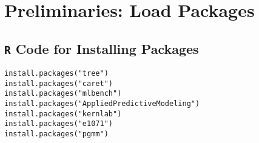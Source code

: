 \documentclass[caret-main.tex]{subfiles}
\begin{document}
\section{Preliminaries: Load  Packages}

\subsection{\texttt{R} Code for Installing Packages}

\begin{framed}
\begin{verbatim}
install.packages("tree")
install.packages("caret")
install.packages("mlbench")
install.packages("AppliedPredictiveModeling")
install.packages("kernlab")
install.packages("e1071")
install.packages("pgmm")
\end{verbatim}
\end{framed}
\end{document}
